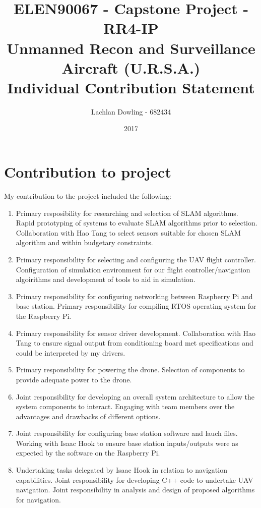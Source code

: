 \documentclass{article}
\title{ELEN90067 - Capstone Project - RR4-IP \\Unmanned Recon and Surveillance Aircraft (U.R.S.A.) \\ \Huge Individual Contribution Statement}
\author{\large Lachlan Dowling - 682434}
\date{2017}
\begin{document}
\thispagestyle{empty}
    \maketitle
    \thispagestyle{empty}
    
    \newpage

    \clearpage
    \setcounter{page}{1}

\section{Contribution to project}
My contribution to the project included the following:
\begin{enumerate}
    \item Primary resposibility for researching and selection of SLAM algorithms. Rapid prototyping of systems to evaluate SLAM algorithms prior to selection. Collaboration with Hao Tang to select sensors suitable for chosen SLAM algorithm and within budgetary constraints.
    \item Primary responsibility for selecting and configuring the UAV flight controller. Configuration of simulation environment for our flight controller/navigation algoirithms and development of tools to aid in simulation. 
    \item Primary responsibility for configuring networking between Raspberry Pi and base station. Primary responsibility for compiling RTOS operating system for the Raspberry Pi.
    \item Primary responsibility for sensor driver development. Collaboration with Hao Tang to ensure signal output from conditioning board met specifications and could be interpreted by my drivers.
    \item Primary responsibility for powering the drone. Selection of components to provide adequate power to the drone.
    \item Joint responsibility for developing an overall system architecture to allow the system components to interact. Engaging with team members over the advantages and drawbacks of different options.
    \item Joint responsibility for configuring base station software and lauch files. Working with Isaac Hook to ensure base station inputs/outputs were as expected by the software on the Raspberry Pi.
    \item Undertaking tasks delegated by Isaac Hook in relation to navigation capabilities. Joint responsibility for developing C++ code to undertake UAV navigation. Joint responsibility in analysis and design of proposed algorithms for navigation.
\end{enumerate}
\end{document}
